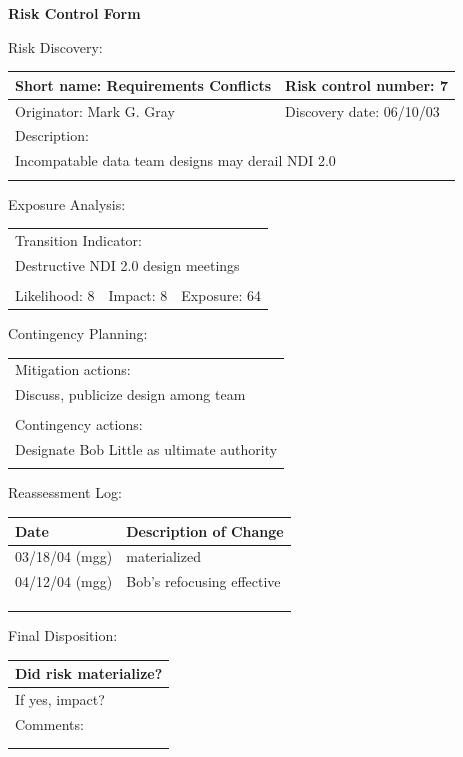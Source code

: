 \documentclass{article}
\begin{document}
\begin{center}\Large\bf
Risk Control Form
\end{center}
\vspace{24pt}

Risk Discovery:

\begin{tabular}{|p{211pt}|p{211pt}|} \hline
Short name: Requirements Conflicts & Risk control number: 7\\ \hline
Originator: Mark G. Gray & Discovery date: 06/10/03\\ \hline
\multicolumn{2}{|l|}{Description:} \\
\multicolumn{2}{|l|}{Incompatable data team designs may derail NDI 2.0} \\
\multicolumn{2}{|l|}{\mbox{}} \\ \hline
\end{tabular}
\vspace{24pt}

Exposure Analysis:

\begin{tabular}{|p{138pt}|p{138pt}|p{138pt}|} \hline
\multicolumn{3}{|l|}{Transition Indicator:} \\
\multicolumn{3}{|l|}{Destructive NDI 2.0 design meetings} \\
\multicolumn{3}{|l|}{\mbox{}} \\ \hline
Likelihood: 8 & Impact: 8 & Exposure: 64\\ \hline
\end{tabular}
\vspace{24pt}

Contingency Planning:

\begin{tabular}{|p{433pt}|} \hline
Mitigation actions: \\
Discuss, publicize design among team \\
\mbox{} \\ \hline
Contingency actions: \\
Designate Bob Little as ultimate authority \\
\mbox{} \\ \hline
\end{tabular}
\vspace{24pt}

Reassessment Log:

\begin{tabular}{|p{72pt}|p{351pt}|} \hline
Date & Description of Change \\ \hline
03/18/04 (mgg) & materialized \\ \hline
04/12/04 (mgg) & Bob's refocusing effective \\ \hline
\mbox{} & \mbox{} \\ \hline
\mbox{} & \mbox{} \\ \hline
\mbox{} & \mbox{} \\ \hline
\end{tabular}
\vspace{24pt}

Final Disposition:

\begin{tabular}{|p{433pt}|} \hline
Did risk materialize? \\ \hline
If yes, impact? \\ \hline
Comments: \\
\mbox{} \\
\mbox{} \\ \hline
\end{tabular}
\end{document}
